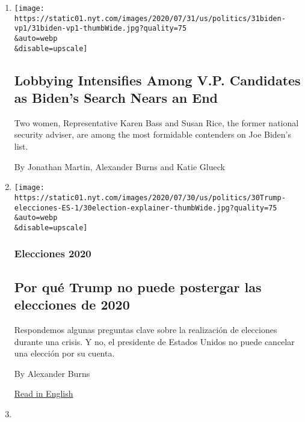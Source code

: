 \begin{enumerate}
\def\labelenumi{\arabic{enumi}.}
\item
  \href{/2020/07/31/us/politics/joseph-biden-vice-president.html}{}

  \texttt{[image: https://static01.nyt.com/images/2020/07/31/us/politics/31biden-vp1/31biden-vp1-thumbWide.jpg?quality=75\\\&auto=webp\\\&disable=upscale]}

  \hypertarget{lobbying-intensifies-among-vp-candidates-as-bidens-search-nears-an-end}{%
  \subsection{Lobbying Intensifies Among V.P. Candidates as Biden's
  Search Nears an
  End}\label{lobbying-intensifies-among-vp-candidates-as-bidens-search-nears-an-end}}

  Two women, Representative Karen Bass and Susan Rice, the former
  national security adviser, are among the most formidable contenders on
  Joe Biden's list.

  By Jonathan Martin, Alexander Burns and Katie Glueck
\item
  \href{/es/2020/07/30/espanol/estados-unidos/trump-retrasar-elecciones.html}{}

  \texttt{[image: https://static01.nyt.com/images/2020/07/30/us/politics/30Trump-elecciones-ES-1/30election-explainer-thumbWide.jpg?quality=75\\\&auto=webp\\\&disable=upscale]}

  \hypertarget{elecciones-2020}{%
  \subsubsection{Elecciones 2020}\label{elecciones-2020}}

  \hypertarget{por-quuxe9-trump-no-puede-postergar-las-elecciones-de-2020}{%
  \subsection{Por qué Trump no puede postergar las elecciones de
  2020}\label{por-quuxe9-trump-no-puede-postergar-las-elecciones-de-2020}}

  Respondemos algunas preguntas clave sobre la realización de elecciones
  durante una crisis. Y no, el presidente de Estados Unidos no puede
  cancelar una elección por su cuenta.

  By Alexander Burns

  \href{https://www.nytimes.com/2020/07/30/us/politics/trump-postpone-election.html}{Read
  in English}
\item
  \href{/2020/07/30/us/politics/trump-delay-election.html}{}


\end{enumerate}

